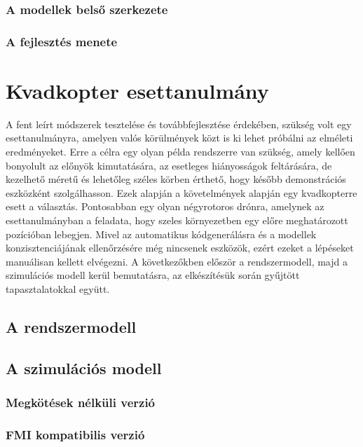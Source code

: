         \subsubsection{A modellek belső szerkezete}

        \subsubsection{A fejlesztés menete}

\section{Kvadkopter esettanulmány}
A fent leírt módszerek tesztelése és továbbfejlesztése érdekében, szükség volt egy esettanulmányra, amelyen valós körülmények közt is ki lehet próbálni az elméleti eredményeket.
Erre a célra egy olyan példa rendszerre van szükség, amely kellően bonyolult az előnyök kimutatására, az esetleges hiányosságok feltárására, de kezelhető méretű és lehetőleg széles körben érthető, hogy később demonstrációs eszközként szolgálhasson.
Ezek alapján a követelmények alapján egy kvadkopterre esett a választás. Pontosabban egy olyan négyrotoros drónra, amelynek az esettanulmányban a feladata, hogy szeles környezetben egy előre meghatározott pozícióban lebegjen.
Mivel az automatikus kódgenerálásra és a modellek konzisztenciájának ellenőrzésére még nincsenek eszközök, ezért ezeket a lépéseket manuálisan kellett elvégezni.
A következőkben először a rendszermodell, majd a szimulációs modell kerül bemutatásra, az elkészítésük során gyűjtött tapasztalatokkal együtt.

    \subsection{A rendszermodell}

    \subsection{A szimulációs modell}

        \subsubsection{Megkötések nélküli verzió}

        \subsubsection{FMI kompatibilis verzió}